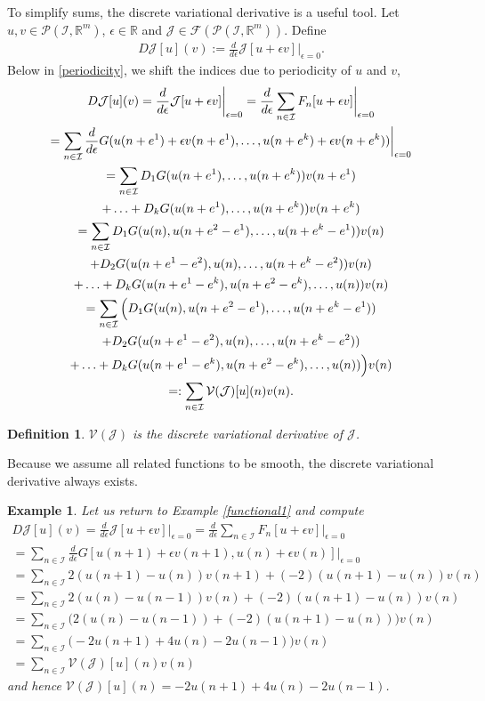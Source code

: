 \documentclass[manuscript]{acmart}
\newcommand{\Rr}{{\mathbb{R}}}
\newcommand{\1}{{\chi}}
\newcommand{\Ii}{{\mathcal{I}}}
\numberwithin{equation}{section}
\theoremstyle{thmlemcorr}
\numberwithin{theorem}{section}
\theoremstyle{thmlemcorr*}
\theoremstyle{defi}
\newtheorem{definition}[theorem]{Definition}
\theoremstyle{remexample}
\newtheorem{example}[theorem]{Example}
\theoremstyle{ass}
\begin{document}
To simplify sums, the discrete variational derivative is a useful tool.
Let $u,v\in\mathcal{P}(\Ii,\Rr^m)$, $\epsilon 
	\in\Rr$ and $\mathcal{J}\in\mathcal{F}(\mathcal{P}(\Ii,\Rr^m))$. Define
	\begin{gather*}
		D\mathcal{J}[u](v):=\frac{d}{d\epsilon}\mathcal{J}[u+\epsilon v]\bigg|_{\epsilon=0}.
	\end{gather*}
	Below in \eqref{periodicity}, we shift the indices due to periodicity of $u$ and $v$,
	\begin{gather}
	\notag	D\mathcal{J}[u](v)=\frac{d}{d\epsilon}\mathcal{J}[u+\epsilon v]\bigg|_{\epsilon=0}=\frac{d}{d\epsilon}\sum_{n\in\Ii}F_n[u+\epsilon v]\bigg|_{\epsilon=0}\\
	\notag	=\sum_{n\in\Ii}\frac{d}{d\epsilon}G(u(n+e^1)+\epsilon v(n+e^1),\ldots,u(n+e^k)+\epsilon v(n+e^k))\bigg|_{\epsilon=0}\\
	\notag	=\sum_{n\in\Ii}D_1G(u(n+e^1),\ldots,u(n+e^k))v(n+e^1)\\
	\notag	+\ldots+D_kG(u(n+e^1),\ldots,u(n+e^k))v(n+e^k)\\
	\label{periodicity}	=\sum_{n\in\Ii}D_1G(u(n),u(n+e^2-e^1),\ldots,u(n+e^k-e^1))v(n)\\
	\notag	+D_2G(u(n+e^1-e^2),u(n),\ldots,u(n+e^k-e^2))v(n)\\
	\notag	+\ldots+D_kG(u(n+e^1-e^k),u(n+e^2-e^k),\ldots,u(n))v(n)\\
	\notag	=\sum_{n\in\Ii}\Big(D_1G(u(n),u(n+e^2-e^1),\ldots,u(n+e^k-e^1))\\
	\notag	+D_2G(u(n+e^1-e^2),u(n),\ldots,u(n+e^k-e^2))\\
	\notag	+\ldots+D_kG(u(n+e^1-e^k),u(n+e^2-e^k),\ldots,u(n))\Big)v(n)\\
	\notag	=:\sum_{n\in\Ii}\mathcal{V}(\mathcal{J})[u](n)v(n).	
	\end{gather}
\begin{definition}
$\mathcal{V}(\mathcal{J})$ is the \emph{discrete variational derivative} of $\mathcal{J}$.
\end{definition}
Because we assume all related functions to be smooth, the discrete variational derivative always exists.
\begin{example}
	Let us return to Example \ref{functional1} and compute
	\begin{gather*}
		D\mathcal{J}[u](v)=\frac{d}{d\epsilon}\mathcal{J}[u+\epsilon v]\bigg|_{\epsilon=0}=\frac{d}{d\epsilon}\sum_{n\in\Ii}F_n[u+\epsilon v]\bigg|_{\epsilon=0}\\
		=\sum_{n\in\Ii}\frac{d}{d\epsilon}G[u(n+1)+\epsilon v(n+1),u(n)+\epsilon v(n)]\bigg|_{\epsilon=0}\\
		=\sum_{n\in\Ii}2(u(n+1)-u(n))v(n+1)+(-2)(u(n+1)-u(n))v(n)\\
		=\sum_{n\in\Ii}2(u(n)-u(n-1))v(n)+(-2)(u(n+1)-u(n))v(n)\\
		=\sum_{n\in\Ii}\Big(2(u(n)-u(n-1))+(-2)(u(n+1)-u(n))\Big)v(n)\\
		=\sum_{n\in\Ii}\Big(-2u(n+1)+4u(n)-2u(n-1)\Big)v(n)\\
		=\sum_{n\in\Ii}\mathcal{V}(\mathcal{J})[u](n)v(n)
	\end{gather*}
	and hence $\mathcal{V}(\mathcal{J})[u](n)=-2u(n+1)+4u(n)-2u(n-1)$.
\end{example}
\end{document}
